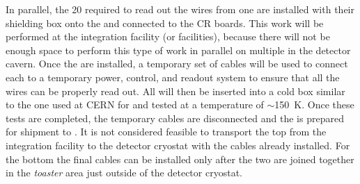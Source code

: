 In parallel, the \num{20} %
 required to read out the
wires from one  are installed with their shielding box onto the  and
connected to the CR boards. This work will be performed at the integration
facility (or facilities), because there will not be enough space to perform
this type of work in parallel on multiple  in the detector cavern. Once
the  are installed, a temporary set of cables will be
used to connect each  to a temporary power, control, and readout system
to ensure that all the wires can be properly read out. All 
will then be inserted into a cold box similar
to the one used at CERN for  and tested at a temperature of
$\sim$\SI{150}{K}. Once these tests
are completed, the temporary cables are disconnected and the  is prepared
for shipment to \surf. It is not considered feasible to transport the
top  from the integration facility to the detector cryostat with the
 cables already installed. For the bottom  the final cables can be
installed only after the two  are joined together in the \textit{toaster} area
just outside of the detector cryostat.


